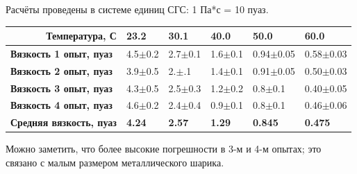 \documentclass[a4paper]{article}
\begin{document}
Расчёты проведены в системе единиц СГС: 1 Па*с = 10 пуаз.
\begin{table}[h]
\begin{tabular}{|l|l|l|l|l|l|}
\hline
\multicolumn{1}{|r|}{\textbf{Температура, С}} & \textbf{23.2} & \textbf{30.1} & \textbf{40.0} & \textbf{50.0}  & \textbf{60.0}  \\ \hline
\textbf{Вязкость 1 опыт, пуаз}                & 4.5$\pm$0.2       & 2.7$\pm$0.1       & 1.6$\pm$0.1       & 0.94$\pm$0.05      & 0.58$\pm$0.03      \\ \hline
\textbf{Вязкость 2 опыт, пуаз}                & 3.9$\pm$0.5       & 2.$\pm$.1       & 1.4$\pm$0.1       & 0.91$\pm$0.05      & 0.50$\pm$0.03      \\ \hline
\textbf{Вязкость 3 опыт, пуаз}                & 4.3$\pm$0.5       & 2.5$\pm$0.3       & 1.2$\pm$0.2       & 0.8$\pm$0.1        & 0.40$\pm$0.05      \\ \hline
\textbf{Вязкость 4 опыт, пуаз}                & 4.6$\pm$0.2       & 2.4$\pm$0.4       & 0.9$\pm$0.1       & 0.8$\pm$0.1        & 0.46$\pm$0.06      \\ \hline
\textbf{Средняя вязкость, пуаз}               & \textbf{4.24} & \textbf{2.57} & \textbf{1.29} & \textbf{0.845} & \textbf{0.475} \\ \hline
\end{tabular}
\end{table}

Можно заметить, что более высокие погрешности в 3-м и 4-м опытах; это связано с малым размером металлического шарика.
\end{document}
